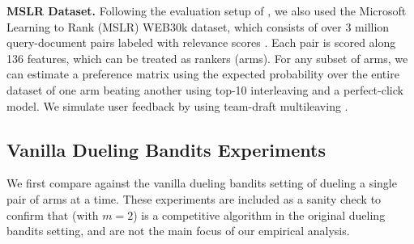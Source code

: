 \textbf{MSLR Dataset.}
Following the evaluation setup of \citet{brost2016multi}, we also  used the Microsoft Learning to Rank (MSLR) WEB30k dataset, which consists of over 3 million query-document pairs labeled with relevance scores \citep{liu2007letor}. Each pair is  scored along 136 features, which can be treated as rankers (arms). For any subset of arms, we can estimate a preference matrix using the expected probability over the entire dataset of one arm beating another using top-10 interleaving and a perfect-click model. 
We simulate user feedback by using team-draft multileaving \citep{schuth2014multileaved}.

\subsection{Vanilla Dueling Bandits Experiments}
We first compare against the vanilla dueling bandits setting of dueling a single pair of arms at a time.  These experiments are included as a sanity check to confirm that \selfsparring (with $m=2$) is a competitive algorithm in the original dueling bandits setting, and are not the main focus of our empirical analysis.


